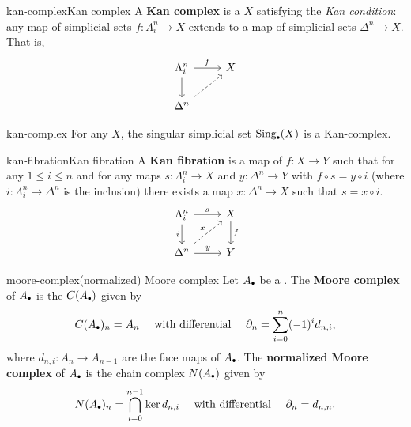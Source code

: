 \begin{topic}{kan-complex}{Kan complex}
    A \textbf{Kan complex} is a  $X$ satisfying the \textit{Kan condition}: any map of simplicial sets $f : \Lambda^n_i \to X$ extends to a map of simplicial sets $\Delta^n \to X$. That is,
    \[ \begin{tikzcd} \Lambda^n_i \arrow{r}{f} \arrow{d} & X \\ \Delta^n \arrow[dashed]{ur} & \end{tikzcd} \]
\end{topic}

\begin{example}{kan-complex}
    For any  $X$, the singular simplicial set $\textup{Sing}_\bdot(X)$ is a Kan-complex.
\end{example}

\begin{topic}{kan-fibration}{Kan fibration}
    A \textbf{Kan fibration} is a map of  $f : X \to Y$ such that for any $1 \le i \le n$ and for any maps $s : \Lambda^n_i \to X$ and $y : \Delta^n \to Y$ with $f \circ s = y \circ i$ (where $i : \Lambda^n_i \to \Delta^n$ is the inclusion) there exists a map $x : \Delta^n \to X$ such that $s = x \circ i$.
    \[ \begin{tikzcd} \Lambda^n_i \arrow{r}{s} \arrow[swap]{d}{i} & X \arrow{d}{f} \\ \Delta^n \arrow{r}{y} \arrow[dashed]{ur}{x} & Y \end{tikzcd} \]
\end{topic}

\begin{topic}{moore-complex}{(normalized) Moore complex}
    Let $A_\bdot$ be a  . The \textbf{Moore complex} of $A_\bdot$ is the  $C(A_\bdot)$ given by
    \[ C(A_\bdot)_n = A_n \quad \textup{ with differential } \quad \partial_n = \sum_{i = 0}^{n} (-1)^i d_{n, i} , \]
    where $d_{n, i} : A_n \to A_{n - 1}$ are the face maps of $A_\bdot$. The \textbf{normalized Moore complex} of $A_\bdot$ is the chain complex $N(A_\bdot)$ given by
    \[ N(A_\bdot)_n = \bigcap_{i = 0}^{n - 1} \ker d_{n, i} \quad \text{ with differential } \quad \partial_n = d_{n, n} . \]
\end{topic}

